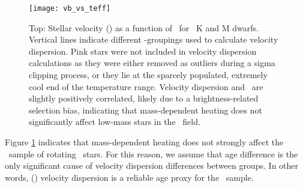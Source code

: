 \begin{figure}
  \caption{
      Top: Stellar velocity (\vb) as a function of \teff\ for
      \kepler\ K and M dwarfs.
Vertical lines indicate different \teff-groupings used to calculate velocity
    dispersion.
Pink stars were not included in velocity dispersion calculations as they were
    either removed as outliers during a sigma clipping process, or they lie at
    the sparcely populated, extremely cool end of the temperature range.
    Velocity dispersion and \teff\ are slightly positively correlated, likely
    due to a brightness-related selection bias, indicating that mass-dependent
    heating does not significantly affect low-mass stars in the \kepler\
    field.
}
  \centering
    \texttt{[image: vb\_vs\_teff]}
\label{fig:vb_vs_teff}
\end{figure}
Figure \ref{fig:vb_vs_teff} indicates that mass-dependent heating does not
strongly affect the \mct\ sample of rotating \kepler\ stars.
For this reason, we assume that age difference is the only significant cause
of velocity dispersion differences between groups.
In other words, (\vb) velocity dispersion is a reliable age proxy for the
\mct\ sample.



